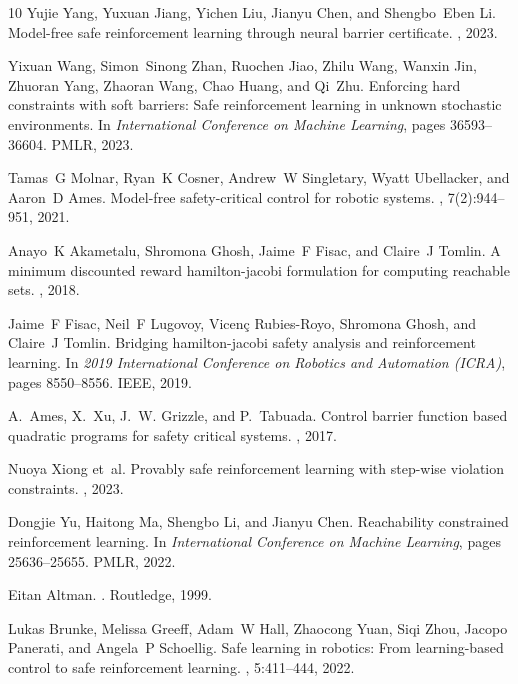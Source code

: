 \documentclass{article}
\theoremstyle{definition}
\begin{document}
\begin{thebibliography}{10}
Yujie Yang, Yuxuan Jiang, Yichen Liu, Jianyu Chen, and Shengbo~Eben Li.
\newblock Model-free safe reinforcement learning through neural barrier certificate.
, 2023.

Yixuan Wang, Simon~Sinong Zhan, Ruochen Jiao, Zhilu Wang, Wanxin Jin, Zhuoran Yang, Zhaoran Wang, Chao Huang, and Qi~Zhu.
\newblock Enforcing hard constraints with soft barriers: Safe reinforcement learning in unknown stochastic environments.
\newblock In {\em International Conference on Machine Learning}, pages 36593--36604. PMLR, 2023.

Tamas~G Molnar, Ryan~K Cosner, Andrew~W Singletary, Wyatt Ubellacker, and Aaron~D Ames.
\newblock Model-free safety-critical control for robotic systems.
, 7(2):944--951, 2021.

Anayo~K Akametalu, Shromona Ghosh, Jaime~F Fisac, and Claire~J Tomlin.
\newblock A minimum discounted reward hamilton-jacobi formulation for computing reachable sets.
, 2018.

Jaime~F Fisac, Neil~F Lugovoy, Vicen{\c{c}} Rubies-Royo, Shromona Ghosh, and Claire~J Tomlin.
\newblock Bridging hamilton-jacobi safety analysis and reinforcement learning.
\newblock In {\em 2019 International Conference on Robotics and Automation (ICRA)}, pages 8550--8556. IEEE, 2019.

A.~{Ames}, X.~{Xu}, J.~W. {Grizzle}, and P.~{Tabuada}.
\newblock Control barrier function based quadratic programs for safety critical systems.
, 2017.

Nuoya Xiong et~al.
\newblock Provably safe reinforcement learning with step-wise violation constraints.
, 2023.

Dongjie Yu, Haitong Ma, Shengbo Li, and Jianyu Chen.
\newblock Reachability constrained reinforcement learning.
\newblock In {\em International Conference on Machine Learning}, pages 25636--25655. PMLR, 2022.

Eitan Altman.
.
\newblock Routledge, 1999.

Lukas Brunke, Melissa Greeff, Adam~W Hall, Zhaocong Yuan, Siqi Zhou, Jacopo Panerati, and Angela~P Schoellig.
\newblock Safe learning in robotics: From learning-based control to safe reinforcement learning.
, 5:411--444, 2022.


\end{thebibliography}
\end{document}
